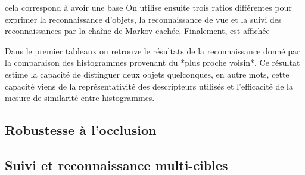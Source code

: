 cela correspond à avoir une base
On utilise ensuite trois ratios différentes pour exprimer la reconnaissance d'objets, la reconnaissance de vue et la suivi des reconnaissances par la chaîne de Markov cachée.
Finalement,  est affichée

\begin{figure}[H]
\end{figure}


{\color{green}
Dans le premier tableaux on retrouve le résultats de la reconnaissance donné par la comparaison des histogrammes provenant du *plus proche voisin*. Ce résultat estime la capacité de distinguer deux objets quelconques, en autre mots, cette capacité viens de la représentativité des descripteurs utilisés et l'efficacité de la mesure de similarité entre histogrammes.
}

\subsection{Robustesse à l'occlusion}

\subsection{Suivi et reconnaissance multi-cibles}

\begin{figure}[H]
\end{figure}
